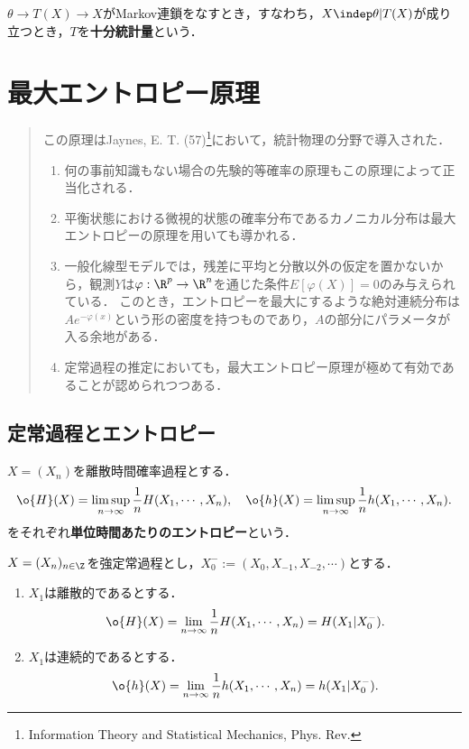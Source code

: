 \documentclass[uplatex,dvipdfmx]{jsreport}
\begin{document}
\begin{definition}
    $\theta\to T(X)\to X$がMarkov連鎖をなすとき，すなわち，$X\indep\theta|T(X)$が成り立つとき，$T$を\textbf{十分統計量}という．
\end{definition}

\chapter{最大エントロピー原理}

\begin{quotation}
    この原理はJaynes, E. T. (57)\footnote{Information Theory and Statistical Mechanics, Phys. Rev.}において，統計物理の分野で導入された．
    \begin{enumerate}
        \item 何の事前知識もない場合の先験的等確率の原理もこの原理によって正当化される．
        \item 平衡状態における微視的状態の確率分布であるカノニカル分布は最大エントロピーの原理を用いても導かれる．
        \item 一般化線型モデルでは，残差に平均と分散以外の仮定を置かないから，観測$Y$は$\varphi:\R^p\to\R^n$を通じた条件$E[\varphi(X)]=0$のみ与えられている．
        このとき，エントロピーを最大にするような絶対連続分布は$Ae^{-\varphi(x)}$という形の密度を持つものであり，$A$の部分にパラメータが入る余地がある．
        \item 定常過程の推定においても，最大エントロピー原理が極めて有効であることが認められつつある．
    \end{enumerate}
\end{quotation}

\section{定常過程とエントロピー}

\begin{definition}
    $X=(X_n)$を離散時間確率過程とする．
    \[\o{H}(X)=\limsup_{n\to\infty}\frac{1}{n}H(X_1,\cdots,X_n),\quad\o{h}(X)=\limsup_{n\to\infty}\frac{1}{n}h(X_1,\cdots,X_n).\]
    をそれぞれ\textbf{単位時間あたりのエントロピー}という．
\end{definition}

\begin{theorem}
    $X=(X_n)_{n\in\Z}$を強定常過程とし，$X_0^-:=(X_0,X_{-1},X_{-2},\cdots)$とする．
    \begin{enumerate}
        \item $X_1$は離散的であるとする．
        \[\o{H}(X)=\lim_{n\to\infty}\frac{1}{n}H(X_1,\cdots,X_n)=H(X_1|X_0^-).\]
        \item $X_1$は連続的であるとする．
        \[\o{h}(X)=\lim_{n\to\infty}\frac{1}{n}h(X_1,\cdots,X_n)=h(X_1|X_0^-).\]
    \end{enumerate}
\end{theorem}
\end{document}
